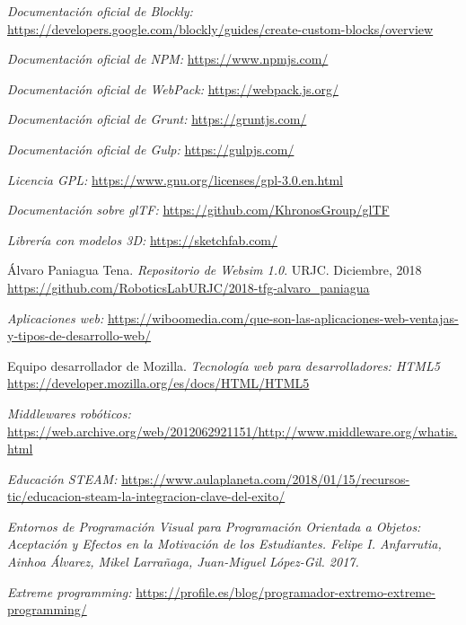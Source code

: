 \begin{thebibliography}{99}
    \textit{Documentación oficial de Blockly:}
    \url{https://developers.google.com/blockly/guides/create-custom-blocks/overview}
    
    \textit{Documentación oficial de NPM:}
    \url{https://www.npmjs.com/}
    
    \textit{Documentación oficial de WebPack:}
    \url{https://webpack.js.org/}
    
    \textit{Documentación oficial de Grunt:}
    \url{https://gruntjs.com/}
    
    \textit{Documentación oficial de Gulp:}
    \url{https://gulpjs.com/}
    
    \textit{Licencia GPL:}
    \url{https://www.gnu.org/licenses/gpl-3.0.en.html}
    
    \textit{Documentación sobre glTF:}
    \url{https://github.com/KhronosGroup/glTF}
    
    \textit{Librería con modelos 3D:}
    \url{https://sketchfab.com/}
    
    Álvaro Paniagua Tena.
    \textit{Repositorio de Websim 1.0}. URJC. Diciembre, 2018
    \url{https://github.com/RoboticsLabURJC/2018-tfg-alvaro_paniagua}
    
    \textit{Aplicaciones web:} 
    \url{https://wiboomedia.com/que-son-las-aplicaciones-web-ventajas-y-tipos-de-desarrollo-web/}
    
    Equipo desarrollador de Mozilla.
    \textit{Tecnología web para desarrolladores: HTML5}   \url{https://developer.mozilla.org/es/docs/HTML/HTML5}
     
    \textit{Middlewares robóticos:}   \url{https://web.archive.org/web/2012062921151/http://www.middleware.org/whatis.html}
    
    \textit{Educación STEAM:}   \url{https://www.aulaplaneta.com/2018/01/15/recursos-tic/educacion-steam-la-integracion-clave-del-exito/}
    
    \textit{Entornos de Programación Visual para Programación Orientada a Objetos: Aceptación y Efectos en la Motivación de los Estudiantes. Felipe I. Anfarrutia, Ainhoa Álvarez, Mikel Larrañaga, Juan-Miguel López-Gil. 2017.}
    
    \textit{Extreme programming: }
    \url{https://profile.es/blog/programador-extremo-extreme-programming/}
  

\end{thebibliography}
